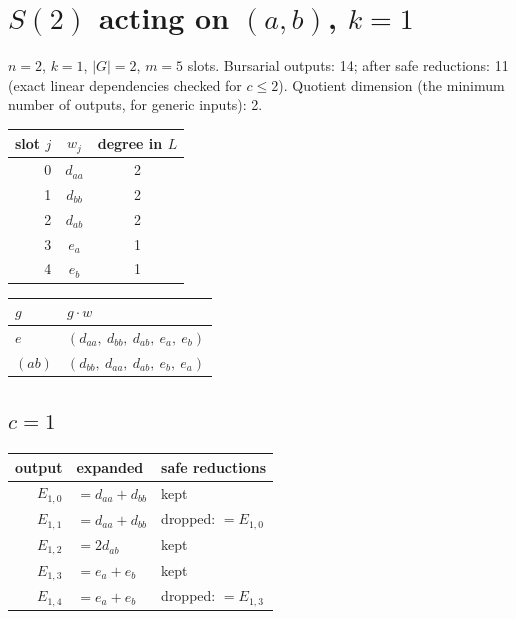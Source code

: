 \documentclass[10pt]{article}
\begin{document}
\clearpage
\section{$S(2)$ acting on $(a, b)$, $k = 1$}
$n = 2$, $k = 1$, $|G| = 2$, $m = 5$ slots. Bursarial outputs: 14; after safe reductions: 11 (exact linear dependencies checked for $c \le 2$). Quotient dimension (the minimum number of outputs, for generic inputs): 2.

\begin{longtable}{rcc}
slot $j$ & $w_j$ & degree in $L$ \\ \hline
0 & $d_{aa}$ & 2 \\
1 & $d_{bb}$ & 2 \\ \hline
2 & $d_{ab}$ & 2 \\ \hline
3 & $e_{a}$ & 1 \\
4 & $e_{b}$ & 1 \\ \hline
\end{longtable}

\begin{longtable}{ll}
$g$ & $g \cdot w$ \\ \hline
$e$ & $(d_{aa},\ d_{bb},\ d_{ab},\ e_{a},\ e_{b})$ \\
$(a b)$ & $(d_{bb},\ d_{aa},\ d_{ab},\ e_{b},\ e_{a})$ \\
\end{longtable}

\subsection*{$c = 1$}
\begin{longtable}{r>{\raggedright\arraybackslash}p{}>{\raggedright\arraybackslash}p{}}
output & expanded & safe reductions \\ \hline
$E_{1,0}$ & $= d_{aa} + d_{bb}$ & kept \\
$E_{1,1}$ & $= d_{aa} + d_{bb}$ & dropped: $= E_{1,0}$ \\
$E_{1,2}$ & $= 2 d_{ab}$ & kept \\
$E_{1,3}$ & $= e_{a} + e_{b}$ & kept \\
$E_{1,4}$ & $= e_{a} + e_{b}$ & dropped: $= E_{1,3}$ \\
\end{longtable}
\end{document}
